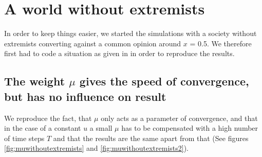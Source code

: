 \documentclass[11pt]{article}
\begin{document}
\section{A world without extremists}
In order to keep things easier, we started the simulations with a society without extremists converting against a common opinion around $x$ = 0.5. We therefore first had to code a situation as given in \cite{Minor} in order to reproduce the results.

\subsection{The weight \texorpdfstring{$\mu$}{TEXT} gives the speed of convergence, but has no influence on result}
We reproduce the fact, that $\mu$ only acts as a parameter of convergence, and that in the case of a constant $u$ a small $\mu$ has to be compensated with a high number of time steps $T$ and that the results are the same apart from that (See figures \ref{fig:muwithoutextremists} and \ref{fig:muwithoutextremists2}).
\end{document}
